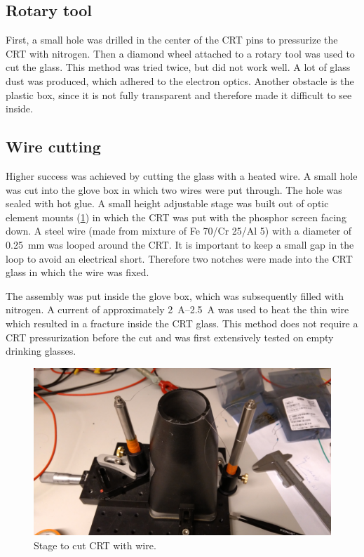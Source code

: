 \subsection{Rotary tool}
\label{subsec:Rotary tool}

First, a small hole was drilled in the center of the CRT pins to pressurize the CRT with nitrogen. Then a diamond wheel attached to a rotary tool was used to cut the glass. This method was tried twice, but did not work well. A lot of glass dust was produced, which adhered to the electron optics. Another obstacle is the plastic box, since it is not fully transparent and therefore made it difficult to see inside. 


\subsection{Wire cutting}
\label{subsec:Wire cutting}

Higher success was achieved by cutting the glass with a heated wire. A small hole was cut into the glove box in which two wires were put through. The hole was sealed with hot glue. A small height adjustable stage was built out of optic element mounts (\cref{fig:Stage to cut CRT with wire}) in which the CRT was put with the phosphor screen facing down. A steel wire (made from mixture of Fe 70/Cr 25/Al 5) with a diameter of \SI{0.25}{\milli\meter} was looped around the CRT. It is important to keep a small gap in the loop to avoid an electrical short. Therefore two notches were made into the CRT glass in which the wire was fixed.

The assembly was put inside the glove box, which was subsequently filled with nitrogen. A current of approximately \SIrange{2}{2.5}{\ampere} was used to heat the thin wire which resulted in a fracture inside the CRT glass. This method does not require a CRT pressurization before the cut and was first extensively tested on empty drinking glasses.

\begin{figure}[ht]
	
	
	\includegraphics[width=.9\textwidth]{Chapters/CRT-handling/Cutting_Stage.jpg}
	\caption{Stage to cut CRT with wire.}
	\label{fig:Stage to cut CRT with wire}
\end{figure}


